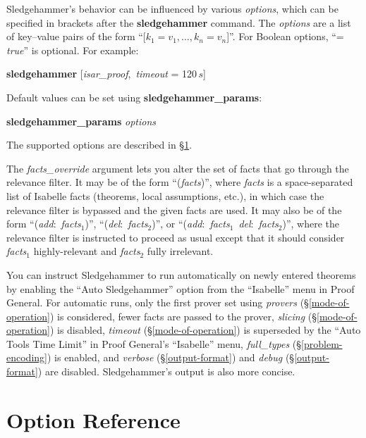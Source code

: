 \documentclass[a4paper,12pt]{article}
\begin{document}
Sledgehammer's behavior can be influenced by various \textit{options}, which can
be specified in brackets after the \textbf{sledgehammer} command. The
\textit{options} are a list of key--value pairs of the form ``[$k_1 = v_1,
\ldots, k_n = v_n$]''. For Boolean options, ``= \textit{true}'' is optional. For
example:

\prew
\textbf{sledgehammer} [\textit{isar\_proof}, \,\textit{timeout} = 120$\,s$]
\postw

Default values can be set using \textbf{sledgehammer\_\allowbreak params}:

\prew
\textbf{sledgehammer\_params} \textit{options}
\postw

The supported options are described in \S\ref{option-reference}.

The \textit{facts\_override} argument lets you alter the set of facts that go
through the relevance filter. It may be of the form ``(\textit{facts})'', where
\textit{facts} is a space-separated list of Isabelle facts (theorems, local
assumptions, etc.), in which case the relevance filter is bypassed and the given
facts are used. It may also be of the form ``(\textit{add}:\ \textit{facts}$_1$)'',
``(\textit{del}:\ \textit{facts}$_2$)'', or ``(\textit{add}:\ \textit{facts}$_1$\
\textit{del}:\ \textit{facts}$_2$)'', where the relevance filter is instructed to
proceed as usual except that it should consider \textit{facts}$_1$
highly-relevant and \textit{facts}$_2$ fully irrelevant.

You can instruct Sledgehammer to run automatically on newly entered theorems by
enabling the ``Auto Sledgehammer'' option from the ``Isabelle'' menu in Proof
General. For automatic runs, only the first prover set using \textit{provers}
(\S\ref{mode-of-operation}) is considered, fewer facts are passed to the prover,
\textit{slicing} (\S\ref{mode-of-operation}) is disabled, \textit{timeout}
(\S\ref{mode-of-operation}) is superseded by the ``Auto Tools Time Limit'' in
Proof General's ``Isabelle'' menu, \textit{full\_types}
(\S\ref{problem-encoding}) is enabled, and \textit{verbose}
(\S\ref{output-format}) and \textit{debug} (\S\ref{output-format}) are disabled.
Sledgehammer's output is also more concise.

\section{Option Reference}
\label{option-reference}

\def\defl{\{}
\def\defr{\}}
\end{document}
